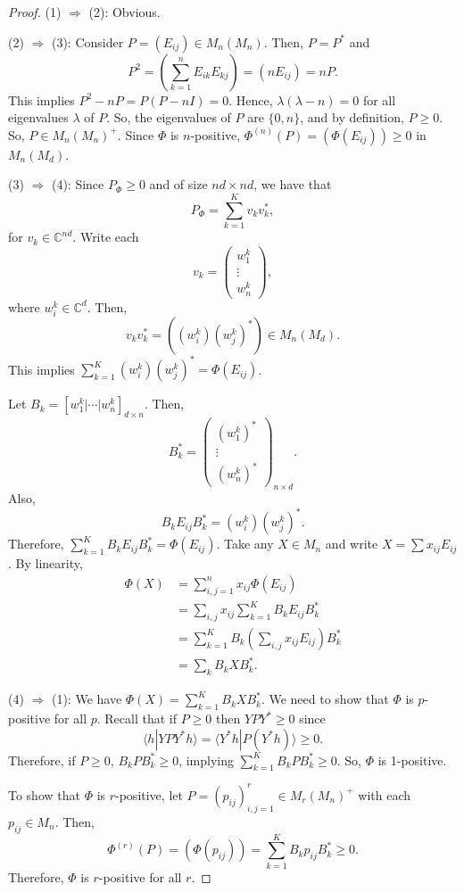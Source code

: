 \documentclass[12pt]{article}
\theoremstyle{definition}
\newcommand{\C}{\mathbb{C}}
\begin{document}
\begin{proof}
(1) $\Rightarrow$ (2): Obvious.

(2) $\Rightarrow$ (3): Consider $P=(E_{ij}) \in M_n(M_n)$. Then, $P=P^*$ and
\[
P^2 = \left(\sum_{k=1}^n E_{ik}E_{kj}\right) = (nE_{ij}) = nP.
\]
This implies $P^2-nP=P(P-nI)=0$. Hence, $\lambda(\lambda-n)=0$ for all eigenvalues $\lambda$ of $P$. So, the eigenvalues of $P$ are $\{0,n\}$, and by definition, $P \geq 0$. So, $P \in M_n(M_n)^+$. Since $\Phi$ is $n$-positive, $\Phi^{(n)}(P)=(\Phi(E_{ij})) \geq 0$ in $M_n(M_d)$.

(3) $\Rightarrow$ (4): Since $P_\Phi \geq 0$ and of size $nd \times nd$, we have that
\[
P_\Phi = \sum_{k=1}^K v_kv_k^* ,
\]
for $v_k \in \C^{nd}$. Write each
\[
v_k = \begin{pmatrix}w_1^k\\ \vdots \\ w_n^k\end{pmatrix},
\]
where $w_i^k \in \C^d$. Then,
\[
v_kv_k^* = ((w_i^k)(w_j^k)^*) \in M_n(M_d).
\]
This implies $\sum_{k=1}^K (w_i^k)(w_j^k)^* = \Phi(E_{ij})$.

Let $B_k = [w_1^k|\cdots|w_n^k]_{d\times n}$. Then,
\[
B_k^* = \begin{pmatrix}(w_1^k)^*\\ \vdots \\ (w_n^k)^*\end{pmatrix}_{n\times d}.
\]
Also,
\[
B_kE_{ij}B_k^* = (w_i^k)(w_j^k)^*.
\]
Therefore, $\sum_{k=1}^K B_kE_{ij}B_k^* = \Phi(E_{ij})$.
Take any $X \in M_n$ and write $X=\sum x_{ij}E_{ij}$. By linearity,
\begin{align*}
\Phi(X) &= \sum_{i,j=1}^n x_{ij}\Phi(E_{ij}) \\
&= \sum_{i,j} x_{ij}\sum_{k=1}^K B_kE_{ij}B_k^* \\
&= \sum_{k=1}^K B_k\left(\sum_{i,j} x_{ij}E_{ij}\right)B_k^* \\
&= \sum_k B_kXB_k^*.
\end{align*}

(4) $\Rightarrow$ (1): We have $\Phi(X)=\sum_{k=1}^K B_kXB_k^*$. We need to show that $\Phi$ is $p$-positive for all $p$. Recall that if $P \geq 0$ then $YPY^* \geq 0$ since
\[
\langle h|YPY^*h\rangle = \langle Y^*h|P(Y^*h)\rangle \geq 0.
\]
Therefore, if $P \geq 0$, $B_kPB_k^* \geq 0$, implying $\sum_{k=1}^K B_kPB_k^* \geq 0$. So, $\Phi$ is 1-positive.

To show that $\Phi$ is $r$-positive, let $P=(p_{ij})_{i,j=1}^r \in M_r(M_n)^+$ with each $p_{ij} \in M_n$. Then,
\[
\Phi^{(r)}(P) = (\Phi(p_{ij})) = \sum_{k=1}^K B_kp_{ij}B_k^* \geq 0.
\]
Therefore, $\Phi$ is $r$-positive for all $r$.
\end{proof}
\end{document}
